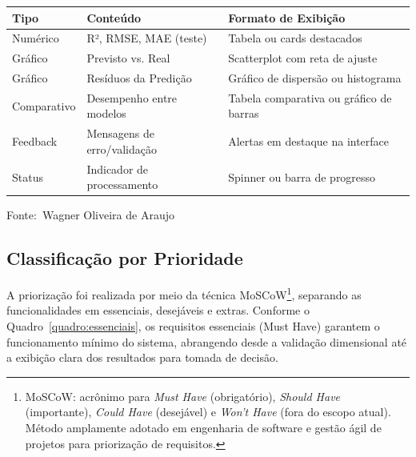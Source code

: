 \documentclass[12pt,a4paper]{article}
\newcommand{\oautor}{Wagner Oliveira de Araujo}
\begin{document}
\begin{quadro}[ht]
\centering
\small
\caption{Saídas esperadas do sistema}
\label{quadro:saidas}
\begin{threeparttable}
\begin{tabularx}{\textwidth}{|l|l|X|} \hline
\textbf{Tipo} & \textbf{Conteúdo} & \textbf{Formato de Exibição} \\ \hline
Numérico & R², RMSE, MAE (teste) & Tabela ou cards destacados \\ \hline
Gráfico & Previsto vs. Real & Scatterplot com reta de ajuste \\ \hline
Gráfico & Resíduos da Predição & Gráfico de dispersão ou histograma \\ \hline
Comparativo & Desempenho entre modelos & Tabela comparativa ou gráfico de barras \\ \hline
Feedback & Mensagens de erro/validação & Alertas em destaque na interface \\ \hline
Status & Indicador de processamento & Spinner ou barra de progresso \\ \hline
\end{tabularx}
\begin{tablenotes}[flushleft]
\footnotesize
\item Fonte:~\oautor
\end{tablenotes}
\end{threeparttable}
\end{quadro}

\newpage
\subsection{Classificação por Prioridade}

A priorização foi realizada por meio da técnica MoSCoW\footnote{MoSCoW: acrônimo para \textit{Must Have} (obrigatório), \textit{Should Have} (importante), \textit{Could Have} (desejável) e \textit{Won't Have} (fora do escopo atual). Método amplamente adotado em engenharia de software e gestão ágil de projetos para priorização de requisitos.}, separando as funcionalidades em essenciais, desejáveis e extras. Conforme o Quadro~\ref{quadro:essenciais}, os requisitos essenciais (Must Have) garantem o funcionamento mínimo do sistema, abrangendo desde a validação dimensional até a exibição clara dos resultados para tomada de decisão.
\end{document}
